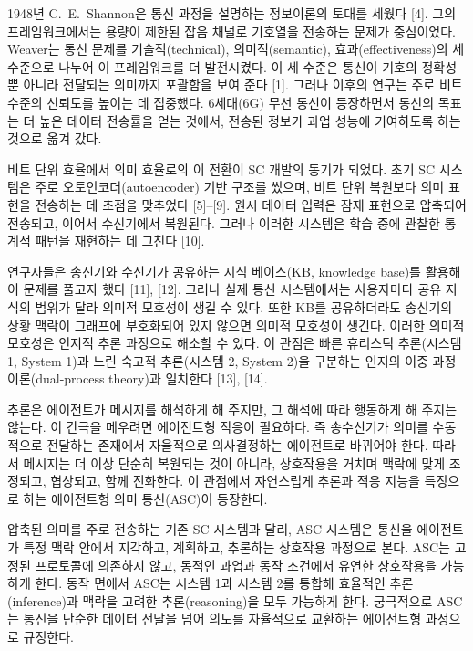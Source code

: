 1948년 C.~E.~Shannon은 통신 과정을 설명하는 정보이론의 토대를 세웠다 [4]. 그의 프레임워크에서는 용량이 제한된 잡음 채널로 기호열을 전송하는 문제가 중심이었다. Weaver는 통신 문제를 기술적(technical), 의미적(semantic), 효과(effectiveness)의 세 수준으로 나누어 이 프레임워크를 더 발전시켰다. 이 세 수준은 통신이 기호의 정확성뿐 아니라 전달되는 의미까지 포괄함을 보여 준다 [1]. 그러나 이후의 연구는 주로 비트 수준의 신뢰도를 높이는 데 집중했다. 6세대(6G) 무선 통신이 등장하면서 통신의 목표는 더 높은 데이터 전송률을 얻는 것에서, 전송된 정보가 과업 성능에 기여하도록 하는 것으로 옮겨 갔다.

비트 단위 효율에서 의미 효율로의 이 전환이 SC 개발의 동기가 되었다. 초기 SC 시스템은 주로 오토인코더(autoencoder) 기반 구조를 썼으며, 비트 단위 복원보다 의미 표현을 전송하는 데 초점을 맞추었다 [5]--[9]. 원시 데이터 입력은 잠재 표현으로 압축되어 전송되고, 이어서 수신기에서 복원된다. 그러나 이러한 시스템은 학습 중에 관찰한 통계적 패턴을 재현하는 데 그친다 [10].

연구자들은 송신기와 수신기가 공유하는 지식 베이스(KB, knowledge base)를 활용해 이 문제를 풀고자 했다 [11], [12]. 그러나 실제 통신 시스템에서는 사용자마다 공유 지식의 범위가 달라 의미적 모호성이 생길 수 있다. 또한 KB를 공유하더라도 송신기의 상황 맥락이 그래프에 부호화되어 있지 않으면 의미적 모호성이 생긴다. 이러한 의미적 모호성은 인지적 추론 과정으로 해소할 수 있다. 이 관점은 빠른 휴리스틱 추론(시스템 1, System 1)과 느린 숙고적 추론(시스템 2, System 2)을 구분하는 인지의 이중 과정 이론(dual-process theory)과 일치한다 [13], [14].

추론은 에이전트가 메시지를 해석하게 해 주지만, 그 해석에 따라 행동하게 해 주지는 않는다. 이 간극을 메우려면 에이전트형 적응이 필요하다. 즉 송수신기가 의미를 수동적으로 전달하는 존재에서 자율적으로 의사결정하는 에이전트로 바뀌어야 한다. 따라서 메시지는 더 이상 단순히 복원되는 것이 아니라, 상호작용을 거치며 맥락에 맞게 조정되고, 협상되고, 함께 진화한다. 이 관점에서 자연스럽게 추론과 적응 지능을 특징으로 하는 에이전트형 의미 통신(ASC)이 등장한다.

압축된 의미를 주로 전송하는 기존 SC 시스템과 달리, ASC 시스템은 통신을 에이전트가 특정 맥락 안에서 지각하고, 계획하고, 추론하는 상호작용 과정으로 본다. ASC는 고정된 프로토콜에 의존하지 않고, 동적인 과업과 동작 조건에서 유연한 상호작용을 가능하게 한다. 동작 면에서 ASC는 시스템 1과 시스템 2를 통합해 효율적인 추론(inference)과 맥락을 고려한 추론(reasoning)을 모두 가능하게 한다. 궁극적으로 ASC는 통신을 단순한 데이터 전달을 넘어 의도를 자율적으로 교환하는 에이전트형 과정으로 규정한다.

